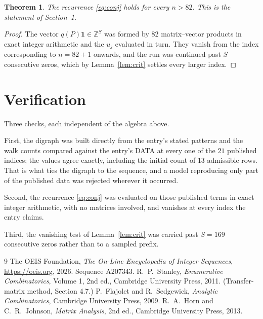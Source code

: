 \documentclass[11pt,a4paper]{article}
\theoremstyle{plain}
\newtheorem{theorem}{Theorem}
\theoremstyle{definition}
\begin{document}
\begin{theorem}
The recurrence \eqref{eq:conj} holds for every $n>82$. This is the statement of
Section~1.
\end{theorem}

\begin{proof}
The vector $q(P)\mathbf{1}\in\mathbb{Z}^{S}$ was formed by $82$ matrix--vector
products in exact integer arithmetic and the $u_j$ evaluated in turn. They vanish from the
index corresponding to $n=82+1$ onwards, and the run was continued past $S$ consecutive
zeros, which by Lemma~\ref{lem:crit} settles every larger index.
\end{proof}

\section{Verification}

Three checks, each independent of the algebra above.

First, the digraph was built directly from the entry's stated patterns and the walk counts
compared against the entry's DATA at every one of the $21$ published indices; the
values agree exactly, including the initial count of $13$ admissible rows. That is
what ties the digraph to the sequence, and a model reproducing only part of the published
data was rejected wherever it occurred.

Second, the recurrence \eqref{eq:conj} was evaluated on those published terms in exact
integer arithmetic, with no matrices involved, and vanishes at every index the entry claims.

Third, the vanishing test of Lemma~\ref{lem:crit} was carried past $S=169$ consecutive
zeros rather than to a sampled prefix.

\begin{thebibliography}{9}
 The OEIS Foundation, \emph{The On-Line Encyclopedia of Integer
Sequences}, \url{https://oeis.org}, 2026. Sequence A207343.
 R.~P.~Stanley, \emph{Enumerative Combinatorics}, Volume 1, 2nd ed.,
Cambridge University Press, 2011. (Transfer-matrix method, Section 4.7.)
 P.~Flajolet and R.~Sedgewick, \emph{Analytic Combinatorics}, Cambridge
University Press, 2009.
 R.~A.~Horn and C.~R.~Johnson, \emph{Matrix Analysis}, 2nd ed., Cambridge
University Press, 2013.
\end{thebibliography}
\end{document}
